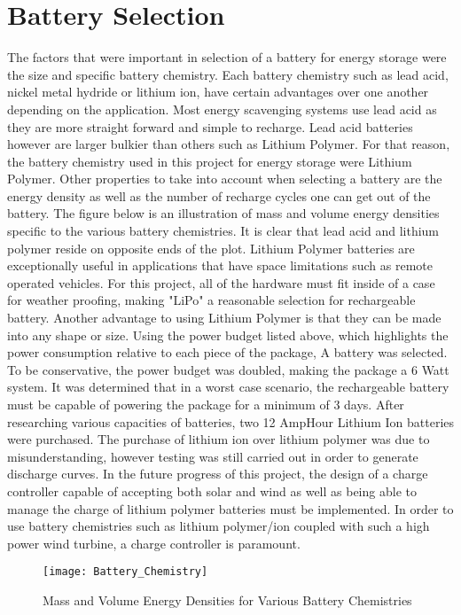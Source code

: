 \section{Battery Selection}
\indent The factors that were important in selection of a battery for energy storage were the size and specific battery chemistry. Each battery chemistry such as lead acid, nickel metal hydride or lithium ion, have certain advantages over one another depending on the application. Most energy scavenging systems use lead acid as they are more straight forward and simple to recharge. Lead acid batteries  however are larger bulkier than others such as Lithium Polymer. For that reason, the battery chemistry used in this project for energy storage were Lithium Polymer.  Other properties to take into account when selecting a battery are the energy density as well as the number of recharge cycles one can get out of the battery. The figure below is an illustration of mass and volume energy densities specific to the various battery chemistries. It is clear that lead acid and lithium polymer reside on opposite ends of the plot. 
\indent Lithium Polymer batteries are exceptionally useful in applications that have space limitations such as remote operated vehicles. For this project, all of the hardware must fit inside of a case for weather proofing, making "LiPo" a reasonable selection for rechargeable battery. Another advantage to using Lithium Polymer is that they can be made into any shape or size. 
\indent Using the power budget listed above, which highlights the power consumption relative to each piece of the package, A battery was selected. To be conservative, the power budget was doubled, making the package a 6 Watt system. It was determined that in a worst case scenario, the rechargeable battery must be capable of powering the package for a minimum of 3 days. After researching various capacities of batteries, two 12 AmpHour Lithium Ion batteries were purchased. The purchase of lithium ion over lithium polymer was due to misunderstanding, however testing was still carried out in order to generate discharge curves. In the future progress of this project, the design of a charge controller capable of accepting both solar and wind as well as being able to manage the charge of lithium polymer batteries must be implemented. In order to use battery chemistries such as lithium polymer/ion coupled with such a high power wind turbine, a charge controller is paramount. 

\begin{figure}
\centering
\texttt{[image: Battery\_Chemistry]}
\caption{Mass and Volume Energy Densities for Various Battery Chemistries}
\label{fig:Battery_Chemistry}
\end{figure}
